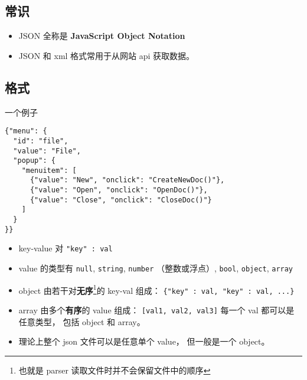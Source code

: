 
\begin{issues}
\issueDraft
\end{issues}

\subsection{常识}
\begin{itemize}
\item JSON 全称是 \textbf{JavaScript Object Notation}
\item JSON 和 xml 格式常用于从网站 api 获取数据。
\end{itemize}

\subsection{格式}
一个例子
\begin{lstlisting}[language=none]
{"menu": {
  "id": "file",
  "value": "File",
  "popup": {
    "menuitem": [
      {"value": "New", "onclick": "CreateNewDoc()"},
      {"value": "Open", "onclick": "OpenDoc()"},
      {"value": "Close", "onclick": "CloseDoc()"}
    ]
  }
}}
\end{lstlisting}

\begin{itemize}
\item key-value 对 \verb|"key" : val|
\item value 的类型有 \verb|null|, \verb|string|, \verb|number| （整数或浮点）, \verb|bool|, \verb|object|, \verb|array|
\item object 由若干对\textbf{无序}\footnote{也就是 parser 读取文件时并不会保留文件中的顺序}的 key-val 组成： \verb|{"key" : val, "key" : val, ...}|
\item array 由多个\textbf{有序}的 value 组成： \verb|[val1, val2, val3]| 每一个 val 都可以是任意类型， 包括 object 和 array。
\item 理论上整个 json 文件可以是任意单个 value， 但一般是一个 object。
\end{itemize}
